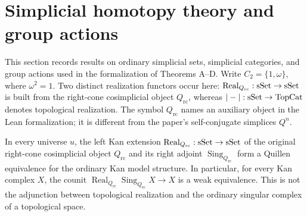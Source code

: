 \section{Simplicial homotopy theory and group actions}

This section records results on ordinary simplicial sets, simplicial categories,
and group actions used in the formalization of Theorems A--D.
Write $C_2=\{1,\omega\}$, where $\omega^2=1$.
Two distinct realization functors occur here:
$\operatorname{Real}_{Q_{\mathrm{rc}}}:\mathrm{sSet}\to\mathrm{sSet}$ is built from the
right-cone cosimplicial object $Q_{\mathrm{rc}}$, whereas
$|-|:\mathrm{sSet}\to\mathrm{TopCat}$ denotes topological realization.
The symbol $Q_{\mathrm{rc}}$ names an auxiliary object in the Lean formalization;
it is different from the paper's self-conjugate simplices $Q^n$.

\begin{resultblock}
\begin{theorem}
In every universe $u$, the left Kan extension
$\operatorname{Real}_{Q_{\mathrm{rc}}}:\mathrm{sSet}\to\mathrm{sSet}$ of the original
right-cone cosimplicial object $Q_{\mathrm{rc}}$ and its right adjoint
$\operatorname{Sing}_{Q_{\mathrm{rc}}}$ form a Quillen equivalence for the
ordinary Kan model structure.
In particular, for every Kan complex $X$, the counit
$\operatorname{Real}_{Q_{\mathrm{rc}}}\operatorname{Sing}_{Q_{\mathrm{rc}}}X\to X$
is a weak equivalence.
This is not the adjunction between topological realization and the ordinary
singular complex of a topological space.
\end{theorem}
\end{resultblock}

